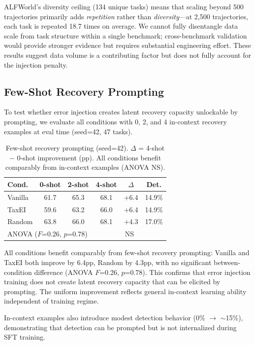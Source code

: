\documentclass[11pt]{article}
\begin{document}
ALFWorld's diversity ceiling (134 unique tasks) means that scaling beyond 500 trajectories primarily adds \emph{repetition} rather than \emph{diversity}---at 2,500 trajectories, each task is repeated 18.7 times on average.
We cannot fully disentangle data scale from task structure within a single benchmark; cross-benchmark validation would provide stronger evidence but requires substantial engineering effort.
These results suggest data volume is a contributing factor but does not fully account for the injection penalty.

\subsection{Few-Shot Recovery Prompting}
\label{sec:fewshot}

To test whether error injection creates latent recovery capacity unlockable by prompting, we evaluate all conditions with 0, 2, and 4 in-context recovery examples at eval time (seed=42, 47 tasks).

\begin{table}[t]
\centering
\small
\begin{tabular}{lccccc}
\toprule
\textbf{Cond.} & \textbf{0-shot} & \textbf{2-shot} & \textbf{4-shot} & \textbf{$\Delta$} & \textbf{Det.} \\
\midrule
Vanilla & 61.7 & 65.3 & 68.1 & +6.4 & 14.9\% \\
TaxEI   & 59.6 & 63.2 & 66.0 & +6.4 & 14.9\% \\
Random  & 63.8 & 66.0 & 68.1 & +4.3 & 17.0\% \\
\midrule
\multicolumn{3}{l}{ANOVA ($F$=0.26, $p$=0.78)} & \multicolumn{3}{c}{NS} \\
\bottomrule
\end{tabular}
\caption{Few-shot recovery prompting (seed=42). $\Delta$ = 4-shot $-$ 0-shot improvement (pp). All conditions benefit comparably from in-context examples (ANOVA NS).}
\label{tab:fewshot}
\end{table}

All conditions benefit comparably from few-shot recovery prompting: Vanilla and TaxEI both improve by 6.4pp, Random by 4.3pp, with no significant between-condition difference (ANOVA $F$=0.26, $p$=0.78).
This confirms that error injection training does not create latent recovery capacity that can be elicited by prompting.
The uniform improvement reflects general in-context learning ability independent of training regime.

In-context examples also introduce modest detection behavior (0\% $\to$ $\sim$15\%), demonstrating that detection can be prompted but is not internalized during SFT training.
\end{document}
